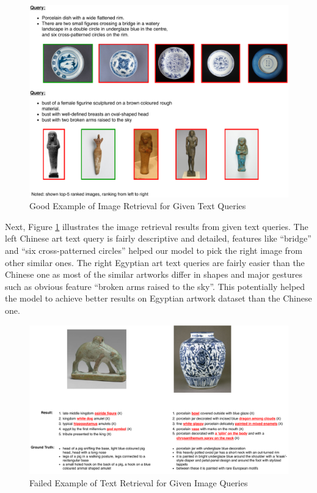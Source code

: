 \begin{figure}[h!]
\centering
\includegraphics[width=\textwidth]{t2i.pdf}
\caption{Good Example of Image Retrieval for Given Text Queries
}
\label{fig:t2i}
\end{figure}

Next, Figure \ref{fig:t2i} illustrates the image retrieval results from given text queries. The left Chinese art text query is fairly descriptive and detailed, features like ``bridge'' and ``six cross-patterned circles'' helped our model to pick the right image from other similar ones. The right Egyptian art text queries are fairly easier than the Chinese one as most of the similar artworks differ in shapes and major gestures such as obvious feature ``broken arms raised to the sky''. This potentially helped the model to achieve better results on Egyptian artwork dataset than the Chinese one.

\begin{figure}[h!]
\centering
\includegraphics[width=\textwidth]{badi2t.pdf}
\caption{Failed Example of Text Retrieval for Given Image Queries}
\label{fig:badi2t}
\end{figure}

